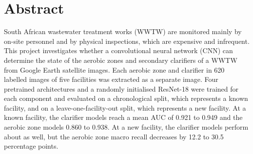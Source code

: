 \chapter*{Abstract}
\makeatletter{}\makeatother

South African wastewater treatment works (WWTW) are monitored mainly by on-site personnel and by physical inspections, which are expensive and infrequent. This project investigates whether a convolutional neural network (CNN) can determine the state of the aerobic zones and secondary clarifiers of a WWTW from Google Earth satellite images. Each aerobic zone and clarifier in 620 labelled images of five facilities was extracted as a separate image. Four pretrained architectures and a randomly initialised ResNet-18 were trained for each component and evaluated on a chronological split, which represents a known facility, and on a leave-one-facility-out split, which represents a new facility. At a known facility, the clarifier models reach a mean AUC of 0.921 to 0.949 and the aerobic zone models 0.860 to 0.938. At a new facility, the clarifier models perform about as well, but the aerobic zone macro recall decreases by 12.2 to 30.5 percentage points.
